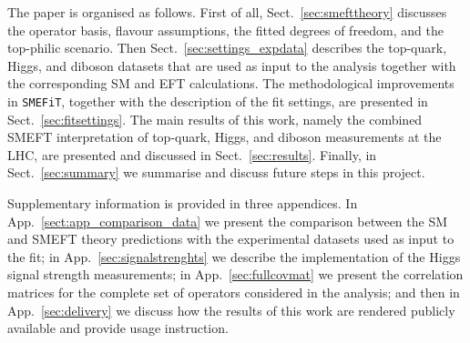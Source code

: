 The paper is organised as follows.
%
First of all, Sect.~\ref{sec:smefttheory} discusses the operator basis,
flavour assumptions, the fitted degrees of freedom,
and the top-philic scenario.
%
Then Sect.~\ref{sec:settings_expdata} describes the top-quark, Higgs,
and diboson datasets that are used as input to the analysis together
with the corresponding SM and EFT calculations.
%
The methodological improvements in {\tt SMEFiT}, together with the description of  the fit settings,
are presented in Sect.~\ref{sec:fitsettings}.
%
The main results of this work, namely the combined SMEFT
interpretation of top-quark, Higgs, and diboson measurements at the LHC,
are presented and discussed in Sect.~\ref{sec:results}.
%
Finally, in Sect.~\ref{sec:summary} we summarise and discuss future steps
in this project.

Supplementary information is provided in three appendices.
%
In App.~\ref{sect:app_comparison_data} we present
the comparison between the SM and SMEFT theory predictions
with the experimental datasets used as input to
the fit;
in App.~\ref{sec:signalstrenghts} we describe the implementation
of  the Higgs signal strength measurements;
{  in App.~\ref{sec:fullcovmat} we present the 
  correlation matrices for the complete set of operators
considered in the analysis; and}
%
then
in App.~\ref{sec:delivery} we discuss how
the results of this work are rendered publicly available
and provide usage instruction.
